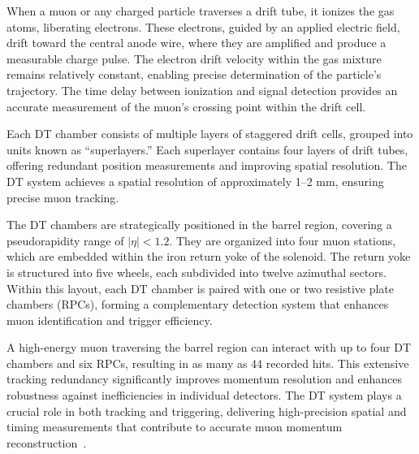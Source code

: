 When a muon or any charged particle traverses a drift tube, it ionizes the gas atoms, liberating electrons. These electrons, guided by an applied electric field, drift toward the central anode wire, where they are amplified and produce a measurable charge pulse. The electron drift velocity within the gas mixture remains relatively constant, enabling precise determination of the particle’s trajectory. The time delay between ionization and signal detection provides an accurate measurement of the muon's crossing point within the drift cell.

Each DT chamber consists of multiple layers of staggered drift cells, grouped into units known as ``superlayers.'' Each superlayer contains four layers of drift tubes, offering redundant position measurements and improving spatial resolution. The DT system achieves a spatial resolution of approximately 1--2 mm, ensuring precise muon tracking.

The DT chambers are strategically positioned in the barrel region, covering a pseudorapidity range of $|\eta| < 1.2$. They are organized into four muon stations, which are embedded within the iron return yoke of the solenoid. The return yoke is structured into five wheels, each subdivided into twelve azimuthal sectors. Within this layout, each DT chamber is paired with one or two resistive plate chambers (RPCs), forming a complementary detection system that enhances muon identification and trigger efficiency.

A high-energy muon traversing the barrel region can interact with up to four DT chambers and six RPCs, resulting in as many as 44 recorded hits. This extensive tracking redundancy significantly improves momentum resolution and enhances robustness against inefficiencies in individual detectors. The DT system plays a crucial role in both tracking and triggering, delivering high-precision spatial and timing measurements that contribute to accurate muon momentum reconstruction~\cite{CMS:DTPerf, CMS:DTAlignment, CMS:MuonTDR}.



